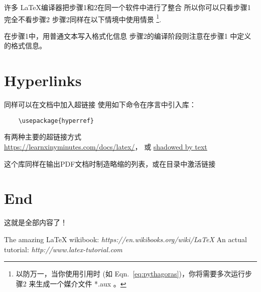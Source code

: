 \documentclass[12pt]{article}
\begin{document}
许多 \LaTeX \hspace{1pt}编译器把步骤1和2在同一个软件中进行了整合
所以你可以只看步骤1完全不看步骤2
步骤2同样在以下情境中使用情景 \footnote{以防万一，当你使用引用时
 (如 Eqn.~\ref{eq:pythagoras})，你将需要多次运行步骤2
来生成一个媒介文件 *.aux 。}.

在步骤1中，用普通文本写入格式化信息
步骤2的编译阶段则注意在步骤1 中定义的格式信息。

\section{Hyperlinks}
同样可以在文档中加入超链接
使用如下命令在序言中引入库：
\begin{verbatim} 
    \usepackage{hyperref}
\end{verbatim}

有两种主要的超链接方式 \\
\url{https://learnxinyminutes.com/docs/latex/}， 或  
\href{https://learnxinyminutes.com/docs/latex/}{shadowed by text}

这个库同样在输出PDF文档时制造略缩的列表，或在目录中激活链接


\section{End}

这就是全部内容了！

\begin{thebibliography}{1}
   The amazing \LaTeX \hspace{1pt} wikibook: {\em 
https://en.wikibooks.org/wiki/LaTeX}
   An actual tutorial: {\em http://www.latex-tutorial.com}
\end{thebibliography}

\end{document}
